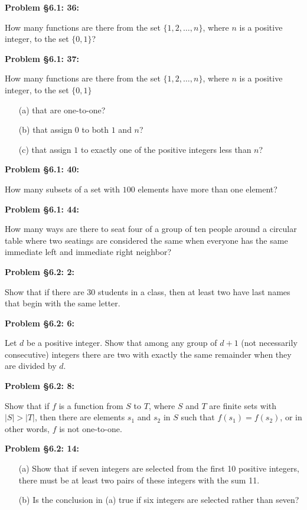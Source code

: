 \documentclass{article}
\newenvironment{problem}[1]
    {\begin{mdframed}[default]
    \textbf{Problem #1:}
    }
    {\end{mdframed}
    }
\begin{document}
\begin{problem}{\S 6.1: 36}
How many functions are there from the set $\{1, 2, \dots, n \}$, where $n$ is a positive integer, to the set $\{ 0, 1 \}$?
\end{problem}

\begin{problem}{\S 6.1: 37}
How many functions are there from the set $\{ 1, 2, \dots, n \}$, where $n$ is a positive integer, to the set $\{ 0, 1 \}$
\begin{enumerate}
    \item[(a)] that are one-to-one?
    \item[(b)] that assign $0$ to both $1$ and $n$?
    \item[(c)] that assign $1$ to exactly one of the positive integers less than $n$?
\end{enumerate}
\end{problem}

\begin{problem}{\S 6.1: 40}
How many subsets of a set with $100$ elements have more than one element?
\end{problem}

\begin{problem}{\S 6.1: 44}
How many ways are there to seat four of a group of ten people around a circular table where two seatings are considered the same when everyone has the same immediate left and immediate right neighbor?
\end{problem}

\begin{problem}{\S 6.2: 2}
Show that if there are 30 students in a class, then at least two have last names that begin with the same letter.
\end{problem}

\begin{problem}{\S 6.2: 6}
Let $d$ be a positive integer. Show that among any group of $d+1$ (not necessarily consecutive) integers there are two with exactly the same remainder when they are divided by $d$.
\end{problem}

\begin{problem}{\S 6.2: 8}
Show that if $f$ is a function from $S$ to $T$, where $S$ and $T$ are finite sets with $|S| > |T|$, then there are elements $s_1$ and $s_2$ in $S$ such that $f(s_1) = f(s_2)$, or in other words, $f$ is not one-to-one.
\end{problem}

\begin{problem}{\S 6.2: 14}
\begin{enumerate}
    \item[(a)] Show that if seven integers are selected from the first 10 positive integers, there must be at least two pairs of these integers with the sum 11.
    \item[(b)] Is the conclusion in (a) true if six integers are selected rather than seven?
\end{enumerate}
\end{problem}
\end{document}
